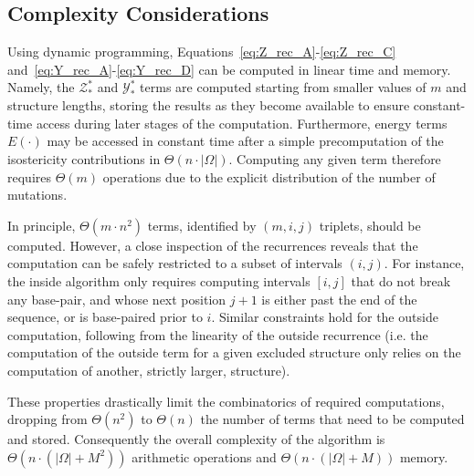 \subsection{Complexity Considerations}
Using dynamic programming, Equations~\eqref{eq:Z_rec_A}-\eqref{eq:Z_rec_C} and~\eqref{eq:Y_rec_A}-\eqref{eq:Y_rec_D} can be computed in linear time and memory. Namely, the $\mathcal{Z}^{*}_{*}$ and $\mathcal{Y}^{*}_{*}$ terms are computed starting from smaller values of $m$ and structure lengths, storing the results as they become available to ensure constant-time access during later stages of the computation. Furthermore, energy terms $E(\cdot)$ may be accessed in constant time after a simple precomputation of the isostericity contributions in $\Theta(n\cdot|\Omega|)$. Computing any given term therefore requires $\Theta(m)$ operations due to the explicit distribution of the number of mutations.

In principle, $\Theta(m\cdot n^2)$ terms, identified by $(m,i,j)$ triplets, should be computed.
However, a close inspection of the recurrences reveals that the computation can be safely restricted to a subset of intervals $(i,j)$.
For instance, the inside algorithm only requires computing intervals $[i,j]$ that do not break any base-pair, and whose next position $j+1$ is either past the end of the sequence, or is base-paired prior to $i$. Similar constraints hold for the outside computation,  following from the linearity of the outside recurrence (i.e. the computation of the outside term for a given excluded structure only relies on the computation of another, strictly larger, structure).
 
These properties drastically limit the combinatorics of required computations, dropping from $\Theta(n^2)$ to $\Theta(n)$ the number of terms that need to be computed and stored. Consequently the overall complexity of the algorithm is $\Theta(n\cdot(|\Omega|+M^2))$ arithmetic operations and $\Theta(n\cdot(|\Omega|+M))$ memory.
